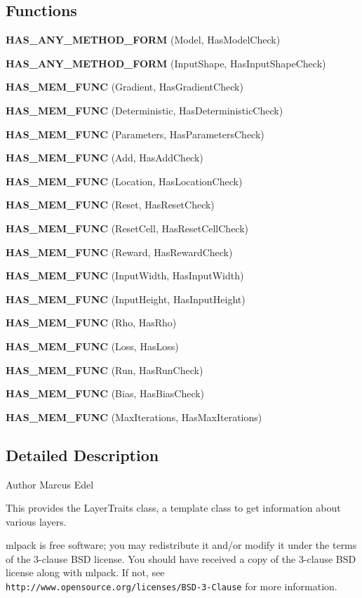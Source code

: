 \subsection*{Functions}
\begin{DoxyCompactItemize}
\item 
\textbf{ H\+A\+S\+\_\+\+A\+N\+Y\+\_\+\+M\+E\+T\+H\+O\+D\+\_\+\+F\+O\+RM} (Model, Has\+Model\+Check)
\item 
\textbf{ H\+A\+S\+\_\+\+A\+N\+Y\+\_\+\+M\+E\+T\+H\+O\+D\+\_\+\+F\+O\+RM} (Input\+Shape, Has\+Input\+Shape\+Check)
\item 
\textbf{ H\+A\+S\+\_\+\+M\+E\+M\+\_\+\+F\+U\+NC} (Gradient, Has\+Gradient\+Check)
\item 
\textbf{ H\+A\+S\+\_\+\+M\+E\+M\+\_\+\+F\+U\+NC} (Deterministic, Has\+Deterministic\+Check)
\item 
\textbf{ H\+A\+S\+\_\+\+M\+E\+M\+\_\+\+F\+U\+NC} (Parameters, Has\+Parameters\+Check)
\item 
\textbf{ H\+A\+S\+\_\+\+M\+E\+M\+\_\+\+F\+U\+NC} (Add, Has\+Add\+Check)
\item 
\textbf{ H\+A\+S\+\_\+\+M\+E\+M\+\_\+\+F\+U\+NC} (Location, Has\+Location\+Check)
\item 
\textbf{ H\+A\+S\+\_\+\+M\+E\+M\+\_\+\+F\+U\+NC} (Reset, Has\+Reset\+Check)
\item 
\textbf{ H\+A\+S\+\_\+\+M\+E\+M\+\_\+\+F\+U\+NC} (Reset\+Cell, Has\+Reset\+Cell\+Check)
\item 
\textbf{ H\+A\+S\+\_\+\+M\+E\+M\+\_\+\+F\+U\+NC} (Reward, Has\+Reward\+Check)
\item 
\textbf{ H\+A\+S\+\_\+\+M\+E\+M\+\_\+\+F\+U\+NC} (Input\+Width, Has\+Input\+Width)
\item 
\textbf{ H\+A\+S\+\_\+\+M\+E\+M\+\_\+\+F\+U\+NC} (Input\+Height, Has\+Input\+Height)
\item 
\textbf{ H\+A\+S\+\_\+\+M\+E\+M\+\_\+\+F\+U\+NC} (Rho, Has\+Rho)
\item 
\textbf{ H\+A\+S\+\_\+\+M\+E\+M\+\_\+\+F\+U\+NC} (Loss, Has\+Loss)
\item 
\textbf{ H\+A\+S\+\_\+\+M\+E\+M\+\_\+\+F\+U\+NC} (Run, Has\+Run\+Check)
\item 
\textbf{ H\+A\+S\+\_\+\+M\+E\+M\+\_\+\+F\+U\+NC} (Bias, Has\+Bias\+Check)
\item 
\textbf{ H\+A\+S\+\_\+\+M\+E\+M\+\_\+\+F\+U\+NC} (Max\+Iterations, Has\+Max\+Iterations)
\end{DoxyCompactItemize}


\subsection{Detailed Description}
\begin{DoxyAuthor}{Author}
Marcus Edel
\end{DoxyAuthor}
This provides the Layer\+Traits class, a template class to get information about various layers.

mlpack is free software; you may redistribute it and/or modify it under the terms of the 3-\/clause B\+SD license. You should have received a copy of the 3-\/clause B\+SD license along with mlpack. If not, see {\tt http\+://www.\+opensource.\+org/licenses/\+B\+S\+D-\/3-\/\+Clause} for more information. 